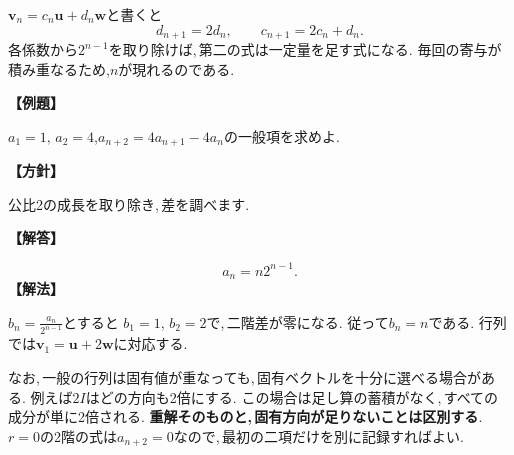 $\boldsymbol v_n=c_n\boldsymbol u+d_n\boldsymbol w$と書くと
\[
 d_{n+1}=2d_n,\qquad c_{n+1}=2c_n+d_n.
\]
各係数から$2^{n-1}$を取り除けば,\,第二の式は一定量を足す式になる.
毎回の寄与が積み重なるため,$n$が現れるのである.

\noindent\textbf{【例題】}\par\nobreak
$a_1=1,\,a_2=4$,$a_{n+2}=4a_{n+1}-4a_n$の一般項を求めよ.

\noindent\textbf{【方針】}\par\nobreak
公比2の成長を取り除き,\,差を調べます.

\noindent\textbf{【解答】}\par\nobreak
\[
 a_n=n2^{n-1}.
\]
\noindent\textbf{【解法】}\par\nobreak
$b_n=\frac{a_n}{2^{n-1}}$とすると
$b_1=1,\,b_2=2$で,\,二階差が零になる.
従って$b_n=n$である.
行列では$\boldsymbol v_1=\boldsymbol u+2\boldsymbol w$に対応する.

なお,\,一般の行列は固有値が重なっても,\,固有ベクトルを十分に選べる場合がある.
例えば$2I$はどの方向も2倍にする.
この場合は足し算の蓄積がなく,\,すべての成分が単に2倍される.
\textbf{重解そのものと,\,固有方向が足りないことは区別する}.
$r=0$の2階の式は$a_{n+2}=0$なので,\,最初の二項だけを別に記録すればよい.
